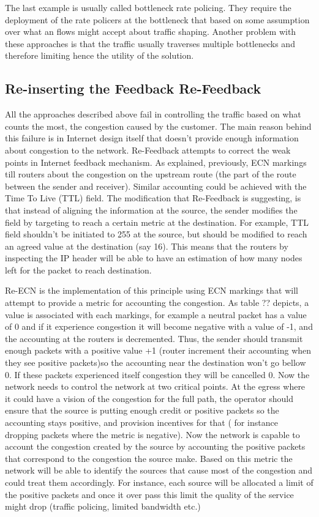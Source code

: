 The last example is usually called bottleneck rate policing. They require the deployment of the rate policers at the bottleneck that based on some assumption over what an flows might accept about traffic shaping. Another problem with these approaches is that the traffic usually traverses multiple bottlenecks and therefore limiting hence the utility of the solution.

\subsection{Re-inserting the Feedback Re-Feedback}
All the approaches described above fail in controlling the traffic based on what counts the most, the congestion caused by the customer. The main reason behind this failure is in Internet design itself that doesn't provide enough information about congestion to the network. Re-Feedback attempts to correct the weak points in Internet feedback mechanism. As explained, previously, ECN markings  till routers about the congestion on the upstream route (the part of the route between the sender and receiver). Similar accounting could be achieved with the Time To Live (TTL) field. The modification that Re-Feedback is suggesting, is that instead of aligning the information at the source, the sender modifies the field by targeting to reach a certain metric at the destination. For example, TTL field shouldn't be initiated  to 255 at the source, but should be modified to reach an agreed value at the destination (say 16). This means that the routers by inspecting the IP header will be able to have an estimation of how many nodes left for the packet to reach destination.

Re-ECN is the implementation of this principle using ECN markings that will attempt to provide a metric for accounting the congestion. As table ?? depicts, a value is associated with each markings, for example a neutral packet has a value of 0 and if it experience congestion it will become negative with a value of -1, and the accounting at the routers is decremented. Thus, the sender should transmit enough packets with a positive value +1 (router increment their accounting when they see positive packets)so the accounting near the destination won't go bellow 0. If these packets experienced itself congestion they will be cancelled 0. Now the network needs to control the network at two critical points. At the egress where it could have a vision of the congestion for the full path, the operator should ensure that the source is putting enough credit or positive packets so the accounting stays positive, and provision incentives for that ( for instance dropping packets  where the metric is negative). Now the network is capable to account the congestion created by the source by accounting the positive packets that correspond to the congestion the source make. Based on this metric the network will be able to identify the sources that cause most of the congestion and could treat them accordingly. For instance, each source will be allocated a limit of the positive packets and once it over pass this limit the quality of the service might drop (traffic policing, limited bandwidth etc.)

